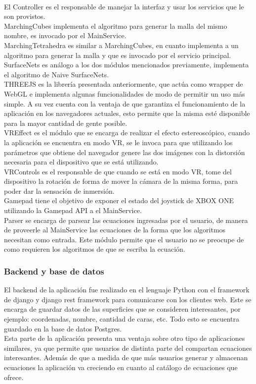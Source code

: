 \documentclass[12pt]{article}
\begin{document}
\\El Controller es el responsable de manejar la interfaz y usar los servicios que le son provistos.
\\MarchingCubes implementa el algoritmo para generar la malla del mismo nombre, es invocado por el MainService.
\\MarchingTetrahedra es similar a MarchingCubes, en cuanto implementa a un algoritmo para generar la malla y que es invocado por el servicio principal.
\\SurfaceNets es análogo a los dos módulos mencionados previamente, implementa el algoritmo de Naive SurfaceNets.
\\THREEJS es la librería presentada anteriormente, que actúa como wrapper de WebGL e implementa algunas funcionalidades de modo de permitir un uso más simple. A su vez cuenta con la ventaja de que garantiza el funcionamiento de la aplicación en los navegadores actuales, esto permite que la misma esté disponible para la mayor cantidad de gente posible.
\\VREffect es el módulo que se encarga de realizar el efecto estereoscópico, cuando la aplicación se encuentra en modo VR, se le invoca para que utilizando los parámetros que obtiene del navegador genere las dos imágenes con la distorsión necesaria para el dispositivo que se está utilizando.
\\VRControls es el responsable de que cuando se está en modo VR, tome del dispositivo la rotación de forma de mover la cámara de la misma forma, para poder dar la sensación de inmersión.
\\Gamepad tiene el objetivo de exponer el estado del joystick de XBOX ONE utilizando la Gamepad API\cite{gamepadapi} a el MainService.
\\Parser se encarga de parsear las ecuaciones ingresadas por el usuario, de manera de proveerle al MainService las ecuaciones de la forma que los algoritmos necesitan como entrada. Este módulo permite que el usuario no se preocupe de como requieren los algoritmos de que se escriba la ecuación.
\subsubsection{Backend y base de datos}
El backend de la aplicación fue realizado en el lenguaje Python con el framework de django y django rest framework para comunicarse con los clientes web. Este se encarga de guardar datos de las superficies que se consideren interesantes, por ejemplo: coordenadas, nombre, cantidad de caras, etc. Todo esto se encuentra guardado en la base de datos Postgres.
\\Esta parte de la aplicación presenta una ventaja sobre otro tipo de aplicaciones similares, ya que permite que usuarios de distinta parte del compartan ecuaciones interesantes. Además de que a medida de que más usuarios generar y almacenan ecuaciones la aplicación va creciendo en cuanto al catálogo de ecuaciones que ofrece.
\clearpage
\end{document}
